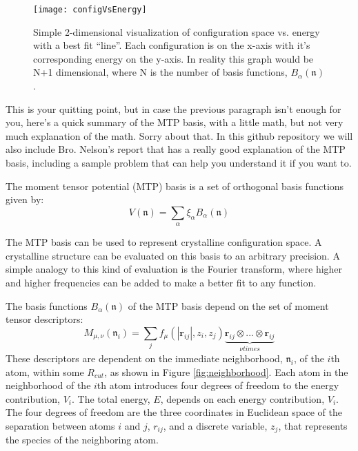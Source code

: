 \documentclass{article}
\begin{document}
\begin{figure}[h]
  \centering
  \texttt{[image: configVsEnergy]}
  \caption{ Simple 2-dimensional visualization of configuration
    space vs. energy with a best fit ``line''. Each configuration is on
    the x-axis with it's corresponding energy on the y-axis. In
    reality this graph would be N+1 dimensional, where N is the
    number of basis functions, $B_{\alpha} \left(\mathfrak{n} \right)
    $.}
  \label{fig:2d}
\end{figure}

This is your quitting point, but in case the previous paragraph isn't
enough for you, here's a quick summary of the MTP basis, with a little
math, but not very much explanation of the math. Sorry about that. In
this github repository we will also include Bro. Nelson's report that
has a really good explanation of the MTP basis, including a sample
problem that can help you understand it if you want to.

The moment tensor potential (MTP) basis is a set of orthogonal basis
functions given by: 
\begin{equation} \label{eq:basis}
  V \left(\mathfrak{n} \right) = \sum\limits_{\alpha}
  \xi_{\alpha}B_{\alpha} \left(\mathfrak{n} \right)
\end{equation}

The MTP basis can be used to represent crystalline configuration
space. A crystalline structure can be evaluated on this basis to an
arbitrary precision. A simple analogy to this kind of evaluation is
the Fourier transform, where higher and higher frequencies can be
added to make a better fit to any function. 

The basis functions $B_{\alpha} \left(\mathfrak{n} \right) $ of the
MTP basis depend on the set of moment tensor descriptors:
\begin{equation} \label{eq:descriptors}
  M_{\mu,\nu}\left(\mathfrak{n}_i\right) = \sum\limits_{j} f_{\mu}
  \left( \left| \mathbf{r}_{ij} \right| ,z_i,z_j \right)
  \underbrace{\mathbf{r}_{ij}\otimes...\otimes\mathbf{r}_{ij}}_{\nu
     times}
\end{equation}
These descriptors are dependent on the immediate neighborhood,
$\mathfrak{n}_i$, of the $i$th atom, within some $R_{cut}$, as shown
in Figure \ref{fig:neighborhood}.  Each atom in the neighborhood of
the $i$th atom introduces four degrees of freedom to the energy
contribution, $V_i$. The total energy, $E$, depends on each energy 
contribution, $V_i$. The four degrees of freedom are the three
coordinates in Euclidean space of the separation between atoms $i$ and
$j$, $r_{ij}$, and a discrete variable, $z_j$, that represents the
species of the neighboring atom. %
\end{document}
